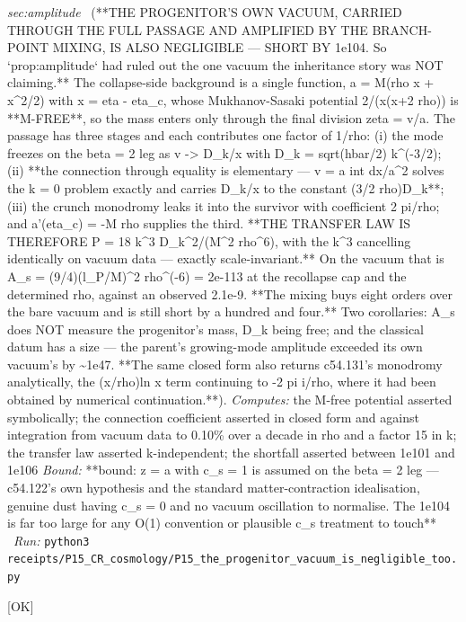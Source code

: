 \begin{description}
\textit{sec:amplitude} \ (**THE PROGENITOR'S OWN VACUUM, CARRIED THROUGH THE FULL PASSAGE AND AMPLIFIED BY THE BRANCH-POINT MIXING, IS ALSO NEGLIGIBLE --- SHORT BY 1e104. So `prop:amplitude` had ruled out the one vacuum the inheritance story was NOT claiming.** The collapse-side background is a single function, a = M(rho x + x\textasciicircum{}2/2) with x = \textbar{}eta - eta\_c\textbar{}, whose Mukhanov-Sasaki potential 2/(x(x+2 rho)) is **M-FREE**, so the mass enters only through the final division zeta = v/a. The passage has three stages and each contributes one factor of 1/rho: (i) the mode freezes on the beta = 2 leg as v -> D\_k/x with D\_k = sqrt(hbar/2) k\textasciicircum{}(-3/2); (ii) **the connection through equality is elementary --- v = a int dx/a\textasciicircum{}2 solves the k = 0 problem exactly and carries D\_k/x to the constant (3/2 rho)D\_k**; (iii) the crunch monodromy leaks it into the survivor with coefficient 2 pi/rho; and a'(eta\_c) = -M rho supplies the third. **THE TRANSFER LAW IS THEREFORE P = 18 k\textasciicircum{}3 D\_k\textasciicircum{}2/(M\textasciicircum{}2 rho\textasciicircum{}6), with the k\textasciicircum{}3 cancelling identically on vacuum data --- exactly scale-invariant.** On the vacuum that is A\_s = (9/4)(l\_P/M)\textasciicircum{}2 rho\textasciicircum{}(-6) = 2e-113 at the recollapse cap and the determined rho, against an observed 2.1e-9. **The mixing buys eight orders over the bare vacuum and is still short by a hundred and four.** Two corollaries: A\_s does NOT measure the progenitor's mass, D\_k being free; and the classical datum has a size --- the parent's growing-mode amplitude exceeded its own vacuum's by \textasciitilde{}1e47. **The same closed form also returns c54.131's monodromy analytically, the (x/rho)ln x term continuing to -2 pi i/rho, where it had been obtained by numerical continuation.**). 
\emph{Computes:} the M-free potential asserted symbolically; the connection coefficient asserted in closed form and against integration from vacuum data to 0.10\% over a decade in rho and a factor 15 in k; the transfer law asserted k-independent; the shortfall asserted between 1e101 and 1e106
 \emph{Bound:} **bound: z = a with c\_s = 1 is assumed on the beta = 2 leg --- c54.122's own hypothesis and the standard matter-contraction idealisation, genuine dust having c\_s = 0 and no vacuum oscillation to normalise. The 1e104 is far too large for any O(1) convention or plausible c\_s treatment to touch**
\ \emph{Run:} \texttt{python3 receipts/P15\_CR\_cosmology/P15\_the\_progenitor\_vacuum\_is\_negligible\_too.py}
\item[\label{rcpt:P16_the_progenitor_composition_is_bracketed}\texttt{P16\_the\_progenitor\_composition\_is\_bracketed}]\hfill\textsf{[OK]}\\

\end{description}

